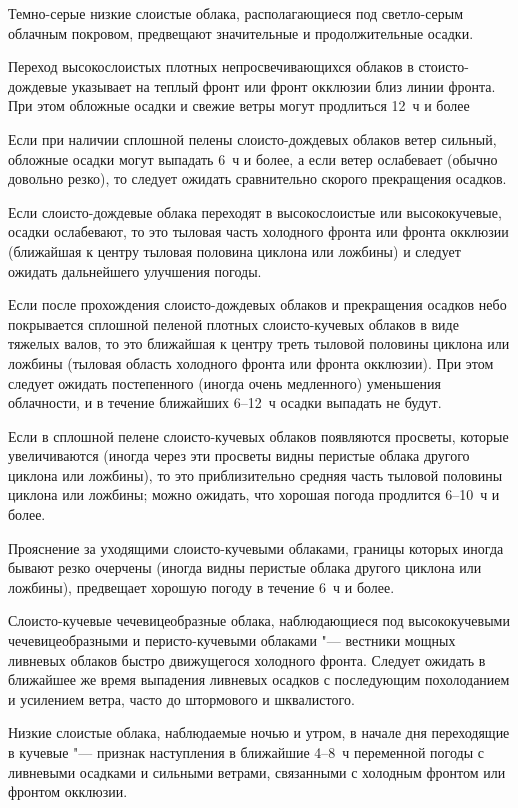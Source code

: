  Темно-серые низкие слоистые облака, располагающиеся под
светло-серым облачным покровом, предвещают значительные и
продолжительные осадки.

 Переход высокослоистых плотных непросвечивающихся облаков в
стоисто-дождевые указывает на теплый фронт или фронт окклюзии близ
линии фронта. При этом обложные осадки и свежие ветры могут продлиться
12~ч и более

 Если при наличии сплошной пелены слоисто-дождевых облаков ветер
сильный, обложные осадки могут выпадать 6~ч и более, а если ветер
ослабевает (обычно довольно резко), то следует ожидать сравнительно
скорого прекращения осадков.

 Если слоисто-дождевые облака переходят в высокослоистые или
высококучевые, осадки ослабевают, то это тыловая часть холодного
фронта или фронта окклюзии (ближайшая к центру тыловая половина
циклона или ложбины) и следует ожидать дальнейшего улучшения погоды.

 Если после прохождения слоисто-дождевых облаков и прекращения
осадков небо покрывается сплошной пеленой плотных слоисто-кучевых
облаков в виде тяжелых валов, то это ближайшая к центру треть тыловой
половины циклона или ложбины (тыловая область холодного фронта или
фронта окклюзии). При этом следует ожидать постепенного (иногда очень
медленного) уменьшения облачности, и в течение ближайших 6--12~ч
осадки выпадать не будут.

 Если в сплошной пелене слоисто-кучевых облаков появляются
просветы, которые увеличиваются (иногда через эти просветы видны
перистые облака другого циклона или ложбины), то это приблизительно
средняя часть тыловой половины циклона или ложбины; можно ожидать, что
хорошая погода продлится 6--10~ч и более.

 Прояснение за уходящими слоисто-кучевыми облаками, границы
которых иногда бывают резко очерчены (иногда видны перистые облака
другого циклона или ложбины), предвещает хорошую погоду в течение 6~ч
и более.

 Слоисто-кучевые чечевицеобразные облака, наблюдающиеся под
высококучевыми чечевицеобразными и перисто-кучевыми облаками "---
вестники мощных ливневых облаков быстро движущегося холодного
фронта. Следует ожидать в ближайшее же время выпадения ливневых осадков
с последующим похолоданием и усилением ветра, часто до штормового и
шквалистого.

 Низкие слоистые облака, наблюдаемые ночью и утром, в начале дня
переходящие в кучевые "--- признак наступления в ближайшие 4--8~ч
переменной погоды с ливневыми осадками и сильными ветрами, связанными
с холодным фронтом или фронтом окклюзии.


